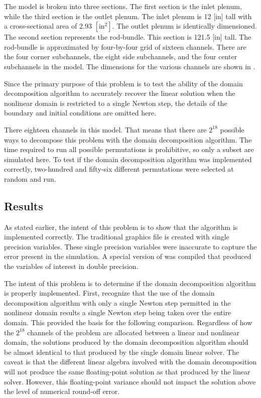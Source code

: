 The \cobra{} model is broken into three sections.
The first section is the inlet plenum, while the third section is the outlet plenum.
The inlet plenum is 12 [in] tall with a cross-sectional area of 2.93 $[ \text{in}^2]$.
The outlet plenum is identically dimensioned.
The second section represents the rod-bundle.
This section is 121.5 [in] tall.
The rod-bundle is approximated by four-by-four grid of sixteen channels.
There are the four corner subchannels, the eight side subchannels, and the four center subchannels in the model.
The dimensions for the various channels are shown in .

Since the primary purpose of this problem is to test the ability of the domain decomposition algorithm to accurately recover the linear solution when the nonlinear domain is restricted to a single Newton step, the details of the boundary and initial conditions are omitted here.

There eighteen channels in this model.
That means that there are $2^{18}$ possible ways to decompose this problem with the domain decomposition algorithm.
The time required to run all possible permutations is prohibitive, so only a subset are simulated here.
To test if the domain decomposition algorithm was implemented correctly, two-hundred and fifty-six different permutations were selected at random and run.

\subsection{Results}
\label{sect:complexResults}

As stated earlier, the intent of this problem is to show that the algorithm is implemented correctly.
The traditional \cobra{} graphics file is created with single precision variables.
These single precision variables were inaccurate to capture the error present in the simulation.
A special version of \cobra{} was compiled that produced the variables of interest in double precision.

The intent of this problem is to determine if the domain decomposition algorithm is properly implemented.
First, recognize that the use of the domain decomposition algorithm with only a single Newton step permitted in the nonlinear domain results a single Newton step being taken over the entire domain.
This provided the basis for the following comparison.
Regardless of how the $2^{18}$ channels of the problem are allocated between a linear and nonlinear domain, the solutions produced by the domain decomposition algorithm should be almost identical to that produced by the single domain linear solver.
The caveat is that the different linear algebra involved with the domain decomposition will not produce the same floating-point solution as that produced by the linear solver.
However, this floating-point variance should not impact the solution above the level of numerical round-off error.

